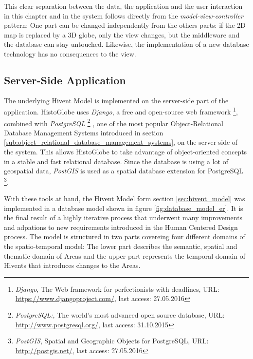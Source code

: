This clear separation between the data, the application and the user interaction in this chapter and in the system follows directly from the \emph{model-view-controller} pattern: One part can be changed independently from the others parts: if the 2D map is replaced by a 3D globe, only the view changes, but the middleware and the database can stay untouched. Likewise, the implementation of a new database technology has no consequences to the view.


\subsection{Server-Side Application} %
\label{sub:server_side_application}

The underlying Hivent Model is implemented on the server-side part of the application. HistoGlobe uses \emph{Django}, a free and open-source web framework
\footnote{
  \emph{Django},
  The Web framework for perfectionists with deadlines,
  URL: \url{https://www.djangoproject.com/},
  last access: 27.05.2016
},
combined with \emph{PostgreSQL}
\footnote{
  \emph{PostgreSQL:},
  The world's most advanced open source database,
  URL: \url{http://www.postgresql.org/},
  last access: 31.10.2015
}
, one of the most popular Object-Relational Database Management Systems introduced in section \ref{sub:object_relational_database_management_systems}, on the server-side of the system. This allows HistoGlobe to take advantage of object-oriented concepts in a stable and fast relational database. Since the database is using a lot of geospatial data, \emph{PostGIS} is used as a spatial database extension for PostgreSQL
\footnote{
  \emph{PostGIS},
  Spatial and Geographic Objects for PostgreSQL,
  URL: \url{http://postgis.net/},
  last access: 27.05.2016
}.

With these tools at hand, the Hivent Model form section \ref{sec:hivent_model}  was implemented in a database model shown in figure \ref{fig:database_model_er}. It is the final result of a highly iterative process that underwent many improvements and adpations to new requirements introduced in the Human Centered Design process. The model is structured in two parts covereing four different domains of the spatio-temporal model: The lower part describes the semantic, spatial and thematic domain of Areas and the upper part represents the temporal domain of Hivents that introduces changes to the Areas.

